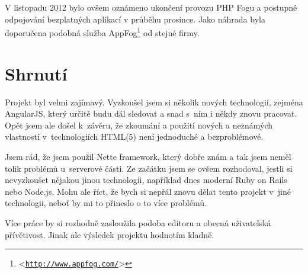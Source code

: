 \documentclass[11pt,twoside,a4paper]{book}
\let\oldUrl\url									%
\renewcommand\url[1]{<\texttt{\oldUrl{#1}}>}
\begin{document}
V listopadu 2012 bylo ovšem oznámeno ukončení provozu PHP Fogu a postupné odpojování bezplatných aplikací v průběhu prosince. Jako náhrada byla doporučena podobná služba AppFog\footnote{\url{http://www.appfog.com/}} od stejné firmy.



\chapter{Shrnutí}
Projekt byl velmi zajímavý. Vyzkoušel jsem si několik nových technologií, zejména AngularJS, který určitě budu dál sledovat a snad s~ním i někdy znovu pracovat. Opět jsem ale došel k~závěru, že zkoumání a použití nových a neznámých vlastností v~technologiích HTML(5) není jednoduché a bezproblémové.

Jsem rád, že jsem použil Nette framework, který dobře znám a tak jsem neměl tolik problémů u~serverové části. Ze začátku jsem se ovšem rozhodoval, jestli si nevyzkoušet nějakou jinou technologii, například dnes moderní Ruby on Rails nebo Node.js. Mohu ale říct, že bych si nepřál znovu dělat tento projekt v~jiné technologii, neboť by mi to přineslo o to více problémů.

Více práce by si rozhodně zasloužila podoba editoru a obecná uživatelská přívětivost. Jinak ale výsledek projektu hodnotím kladně.

{}

\end{document}
